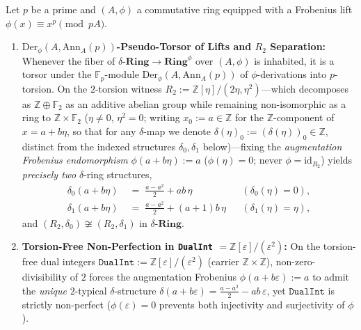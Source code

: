 \begin{proposition}\label{prop:r2-delta-torsor}%
%
Let $p$ be a prime and $(A, \phi)$ a commutative ring equipped with a Frobenius lift $\phi(x) \equiv x^p \pmod{pA}$.
\begin{enumerate}
  \item \textbf{$\mathrm{Der}_\phi(A, \mathrm{Ann}_A(p))$-Pseudo-Torsor of Lifts and $R_2$ Separation:} Whenever the fiber of $\delta\text{-}\mathbf{Ring} \to \mathbf{Ring}^\phi$ over $(A, \phi)$ is inhabited, it is a torsor under the $\mathbb{F}_p$-module $\mathrm{Der}_\phi(A, \mathrm{Ann}_A(p))$ of $\phi$-derivations into $p$-torsion. On the $2$-torsion witness $R_2 := \mathbb{Z}[\eta]/(2\eta, \eta^2)$---which decomposes as $\mathbb{Z} \oplus \mathbb{F}_2$ as an additive abelian group while remaining non-isomorphic as a ring to $\mathbb{Z} \times \mathbb{F}_2$ ($\eta \neq 0$, $\eta^2 = 0$; writing $x_0 := a \in \mathbb{Z}$ for the $\mathbb{Z}$-component of $x = a + b\eta$, so that for any $\delta$-map we denote $\delta(\eta)_0 := (\delta(\eta))_0 \in \mathbb{Z}$, distinct from the indexed structures $\delta_0, \delta_1$ below)---fixing the \emph{augmentation Frobenius endomorphism} $\phi(a + b\eta) := a$ ($\phi(\eta) = 0$; never $\phi = \mathrm{id}_{R_2}$) yields \emph{precisely two} $\delta$-ring structures,
  \[
    \begin{aligned}
      \delta_0(a + b\eta) &\;=\; \frac{a - a^2}{2} + ab\,\eta &&(\delta_0(\eta) = 0), \\
      \delta_1(a + b\eta) &\;=\; \frac{a - a^2}{2} + (a+1)b\,\eta &&(\delta_1(\eta) = \eta),
    \end{aligned}
  \]
  and $(R_2, \delta_0) \not\cong (R_2, \delta_1)$ in $\delta\text{-}\mathbf{Ring}$.
  \item \textbf{Torsion-Free Non-Perfection in \texttt{DualInt} $= \mathbb{Z}[\varepsilon]/(\varepsilon^2)$:} On the torsion-free dual integers $\mathtt{DualInt} := \mathbb{Z}[\varepsilon]/(\varepsilon^2)$ (carrier $\mathbb{Z} \times \mathbb{Z}$), non-zero-divisibility of $2$ forces the augmentation Frobenius $\phi(a + b\varepsilon) := a$ to admit the \emph{unique} $2$-typical $\delta$-structure $\delta(a + b\varepsilon) = \frac{a - a^2}{2} - ab\,\varepsilon$, yet $\mathtt{DualInt}$ is strictly non-perfect ($\phi(\varepsilon) = 0$ prevents both injectivity and surjectivity of $\phi$).
\end{enumerate}
\end{proposition}

